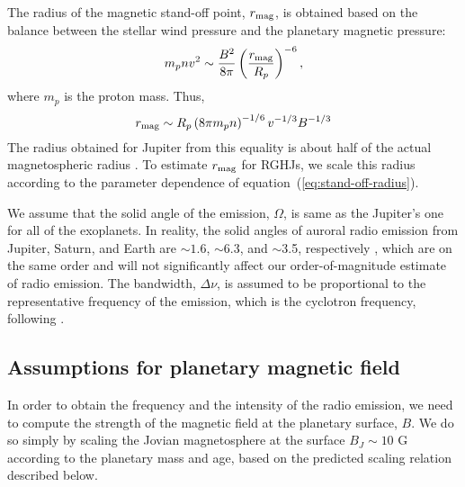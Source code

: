 \documentclass[iop,numberedappendix,apj]{emulateapj}
\begin{document}
The radius of the magnetic stand-off point, $r_{\rm mag}$, is obtained based on the balance between the stellar wind pressure and the planetary magnetic pressure: 
\begin{equation}
m_p n v ^2 \sim \frac{B^2}{8\pi}\left( \frac{r_{\rm mag}}{R_p} \right)^{-6}  \label{eq:stand-off} ,
\end{equation}
where $m_p$ is the proton mass. Thus, 
\begin{equation}
r_{\rm mag} \sim R_p \left( 8\pi m_p n \right) ^{-1/6} v^{-1/3} B^{-1/3} \label{eq:stand-off-radius} 
\end{equation}
The radius obtained for Jupiter from this equality is about half of the actual magnetospheric radius \citep[][]{griesmeier2005}. 
To estimate $r_{\rm mag}$ for RGHJs, we scale this radius according to the parameter dependence of equation~(\ref{eq:stand-off-radius}). 


We assume that the solid angle of the emission, $\Omega $, is same as the Jupiter's one for all of the exoplanets.
In reality, the solid angles of auroral radio emission from  Jupiter, Saturn, and Earth are $\sim 1.6$, $\sim $6.3, and $\sim $3.5, respectively \citep{desch+kaiser1984}, which are on the same order and will not significantly affect our order-of-magnitude estimate of radio emission. 
The bandwidth, $\Delta \nu$, is assumed to be proportional to the representative frequency of the emission, which is the cyclotron frequency, following \citet{griesmeier2007b}.


\subsection{Assumptions for planetary magnetic field}
\label{ss:magneticfield}

In order to obtain the frequency and the intensity of the radio emission, we need to compute the strength of the magnetic field at the planetary surface, $B$. 
We do so simply by scaling the Jovian magnetosphere at the surface $B_J \sim 10$ G according to the planetary mass and age, based on the predicted scaling relation described below. 
\end{document}

